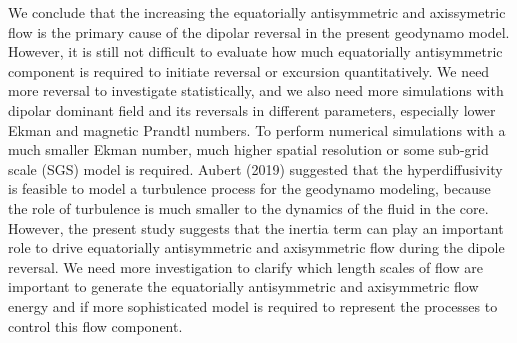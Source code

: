We conclude that the increasing the equatorially antisymmetric and axissymetric flow is the primary cause of the dipolar reversal in the present geodynamo model. 
However, it is still not difficult to evaluate how much equatorially antisymmetric component is required to initiate reversal or excursion quantitatively. 
We need more reversal to investigate statistically, and we also need more simulations with dipolar dominant field and its reversals in different parameters, especially lower Ekman and magnetic Prandtl numbers. 
To perform numerical simulations with a much smaller Ekman number, much higher spatial resolution or some sub-grid scale (SGS) model is required. 
Aubert {\color{red}(2019)} suggested that the hyperdiffusivity is feasible to model a turbulence process for the geodynamo modeling, because the role of turbulence is much smaller to the dynamics of the fluid in the core. 
However, the present study suggests that the inertia term can play an important role to drive equatorially antisymmetric and axisymmetric flow during the dipole reversal. 
We need more investigation to clarify which length scales of flow are important to generate the equatorially antisymmetric and axisymmetric flow energy and if more sophisticated model is required to represent the processes to control this flow component.

%
